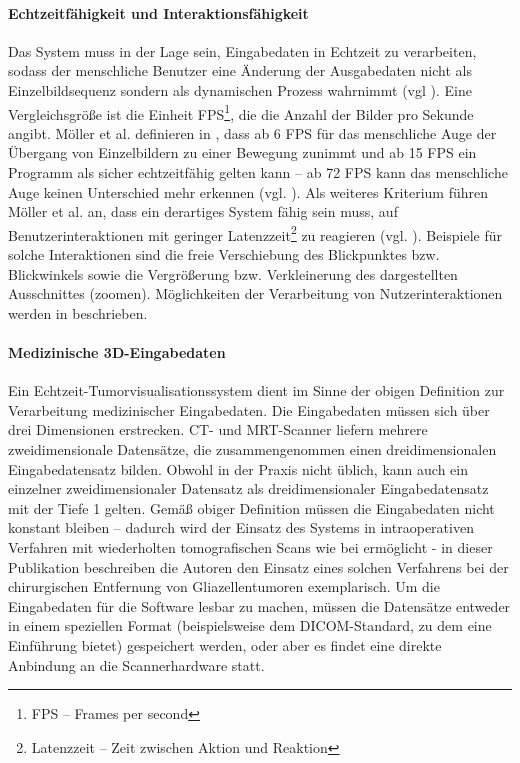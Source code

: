 \documentclass[ngerman,pdftex,paper=A4,DIV=calc,titlepage,12pt]{scrartcl}
\newtheorem[L]{boxedDefinition}{Definition}
\begin{document}
\paragraph{Echtzeitfähigkeit und Interaktionsfähigkeit} \label{p:rtcapability} Das System muss in der Lage sein, Eingabedaten in Echtzeit zu verarbeiten, sodass der menschliche Benutzer eine Änderung der Ausgabedaten nicht als Einzelbildsequenz sondern als dynamischen Prozess wahrnimmt (vgl \cite[Kapitel 1, Seite 1]{Moeller2008}). Eine Vergleichsgröße ist die Einheit FPS\footnote{FPS -- Frames per second}, die die Anzahl der Bilder pro Sekunde angibt. Möller et al. definieren in \cite{Moeller2008}, dass ab 6 FPS für das menschliche Auge der Übergang von Einzelbildern zu einer Bewegung zunimmt und ab 15 FPS ein Programm als sicher echtzeitfähig gelten kann -- ab 72 FPS kann das menschliche Auge keinen Unterschied mehr erkennen (vgl. \cite[Kapitel 1, Seite 1]{Moeller2008}). Als weiteres Kriterium führen Möller et al. an, dass ein derartiges System fähig sein muss, auf Benutzerinteraktionen mit geringer Latenzzeit\footnote{Latenzzeit -- Zeit zwischen Aktion und Reaktion} zu reagieren (vgl. \cite[Kapitel 1, Seite 1]{Moeller2008}). Beispiele für solche Interaktionen sind die freie Verschiebung des Blickpunktes bzw. Blickwinkels sowie die Vergrößerung bzw. Verkleinerung des dargestellten Ausschnittes (\glqq zoomen\grqq). Möglichkeiten der Verarbeitung von Nutzerinteraktionen werden in \cite[Kapitel 3.6, Seite 62-66]{Bruckner2004} beschrieben.

\paragraph{Medizinische 3D-Eingabedaten} Ein Echtzeit-Tumorvisualisationssystem dient im Sinne der obigen Definition zur Verarbeitung medizinischer Eingabedaten. Die Eingabedaten müssen sich über drei Dimensionen erstrecken. CT- und MRT-Scanner liefern mehrere zweidimensionale Datensätze, die zusammengenommen einen dreidimensionalen Eingabedatensatz bilden. Obwohl in der Praxis nicht üblich, kann auch ein einzelner zweidimensionaler Datensatz als dreidimensionaler Eingabedatensatz mit der Tiefe 1 gelten. Gemäß obiger Definition müssen die Eingabedaten nicht konstant bleiben -- dadurch wird der Einsatz des Systems in intraoperativen Verfahren mit wiederholten tomografischen Scans wie bei \cite{Okudera1994} ermöglicht - in dieser Publikation beschreiben die Autoren den Einsatz eines solchen Verfahrens bei der chirurgischen Entfernung von Gliazellentumoren exemplarisch. Um die Eingabedaten für die Software lesbar zu machen, müssen die Datensätze entweder in einem speziellen Format (beispielsweise dem DICOM-Standard, zu dem \cite{Mildenberger2002} eine Einführung bietet) gespeichert werden, oder aber es findet eine direkte Anbindung an die Scannerhardware statt.
\end{document}
